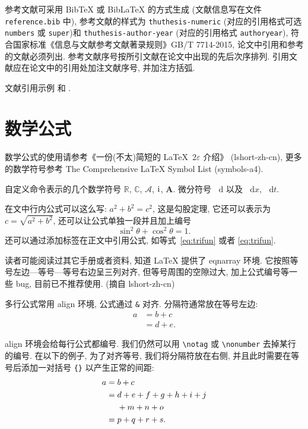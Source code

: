 \documentclass[UTF8,openany]{ctexbook}
\numberwithin{equation}{chapter}
\numberwithin{figure}{chapter}
\numberwithin{table}{chapter}
\theoremstyle{mystyle}
\newcommand{\dif}{\mathop{}\!\mathrm{d}}
\newcommand{\CC}{\ensuremath{\mathbb{C}}}
\newcommand{\RR}{\ensuremath{\mathbb{R}}}
\newcommand{\dx}[1][x]{\mathop{}\!\mathrm{d}#1}
\newcommand{\ii}{\mathrm{i}\mkern1mu} %
\newcommand{\A}{\mathcal{A}}
\newcommand{\bA}{\boldsymbol{A}}
\begin{document}
参考文献可采用 BibTeX 或 BibLaTeX 的方式生成 (文献信息写在文件 \verb|reference.bib| 中), 参考文献的样式为 \verb|thuthesis-numeric| (对应的引用格式可选 \verb|numbers| 或  \verb|super|)和 \verb|thuthesis-author-year| (对应的引用格式 \verb|authoryear|), 符合国家标准《信息与文献参考文献著录规则》GB/T 7714-2015, 论文中引用和参考的文献必须列出. 参考文献序号按所引文献在论文中出现的先后次序排列. 引用文献应在论文中的引用处加注文献序号, 并加注方括弧.

文献引用示例 \cite{LiLiu1997} 和 \cite{Adams2003,Shen1994}.


\section{数学公式}\label{sec:2-3}

数学公式的使用请参考《一份(不太)简短的 \LaTeX~2$\varepsilon$ 介绍》 (lshort-zh-cn), 更多的数学符号参考 The Comprehensive LaTeX Symbol List (symbols-a4).

自定义命令表示的几个数学符号 $\RR$, $\CC$, $\A$, $\ii$, $\bA$. 微分符号 $\dif$ 以及 $\dx$, $\dx[t]$.

在文中行内公式可以这么写: $a^2+b^2=c^2$, 这是勾股定理, 它还可以表示为 $c=\sqrt{a^2+b^2}$, 还可以让公式单独一段并且加上编号
\begin{equation}\label{eq:trifun}
\sin^2{\theta}+\cos^2{\theta}=1.
\end{equation}
还可以通过添加标签在正文中引用公式, 如等式~\eqref{eq:trifun} 或者 \ref{eq:trifun}.

读者可能阅读过其它手册或者资料, 知道 LaTeX 提供了 eqnarray 环境. 它按照等号左边—等号—等号右边呈三列对齐, 但等号周围的空隙过大, 加上公式编号等一些 bug, 目前已不推荐使用. (摘自 lshort-zh-cn)

多行公式常用 align 环境, 公式通过 \verb|&| 对齐. 分隔符通常放在等号左边:
\begin{align}
a & = b + c \\
& = d + e.
\end{align}

align 环境会给每行公式都编号. 我们仍然可以用 \verb|\notag| 或 \verb|\nonumber| 去掉某行的编号. 在以下的例子,
为了对齐等号, 我们将分隔符放在右侧, 并且此时需要在等号后添加一对括号 \verb|{}| 以产生正常的间距:
\begin{align}
a ={} & b + c \\
={} & d + e + f + g + h + i + j \notag \\
& + m + n + o \\
={} & p + q + r + s.
\end{align}
\end{document}
